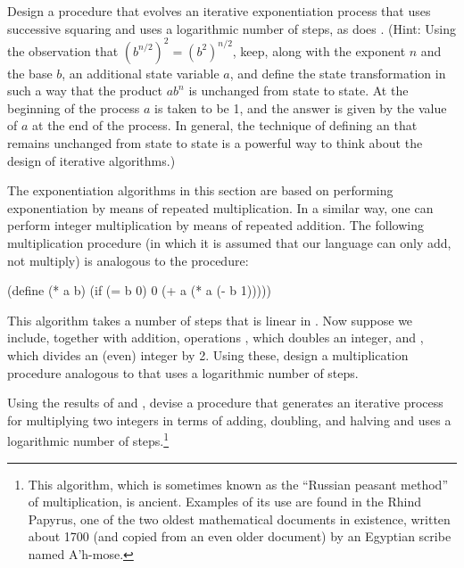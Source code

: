 \begin{exerciseGroup}
\label{Exercise 1.16}
 Design a procedure that evolves
an iterative exponentiation process that uses successive squaring and uses a
logarithmic number of steps, as does .  (Hint: Using the
observation that \( (b^{n / 2})^2 = (b^2)^{n / 2} \), keep, along with
the exponent \( n \) and the base \( b \), an additional state variable \( a \), and
define the state transformation in such a way that the product \( ab^n \)
is unchanged from state to state.  At the beginning of the process
\( a \) is taken to be 1, and the answer is given by the value of \( a \) at the
end of the process.  In general, the technique of defining an
 that remains unchanged from state to state is a
powerful way to think about the design of iterative algorithms.)

\label{Exercise 1.17}
 The exponentiation algorithms in
this section are based on performing exponentiation by means of repeated
multiplication.  In a similar way, one can perform integer multiplication by
means of repeated addition.  The following multiplication procedure (in which
it is assumed that our language can only add, not multiply) is analogous to the
 procedure:

\begin{codeBlock}
(define (* a b)
  (if (= b 0)
      0
      (+ a (* a (- b 1)))))
\end{codeBlock}

This algorithm takes a number of steps that is linear in .  Now suppose
we include, together with addition, operations , which doubles an
integer, and , which divides an (even) integer by 2.  Using these,
design a multiplication procedure analogous to  that uses a
logarithmic number of steps.

\label{Exercise 1.18}
 Using the results of
 and , devise a procedure that generates
an iterative process for multiplying two integers in terms of adding, doubling,
and halving and uses a logarithmic number of steps.\footnote{This algorithm,
which is sometimes known as the ``Russian peasant method'' of multiplication,
is ancient.  Examples of its use are found in the Rhind Papyrus, one of the two
oldest mathematical documents in existence, written about 1700 
(and copied from an even older document) by an Egyptian scribe named A\( \! \)'h-mose.}


\end{exerciseGroup}
